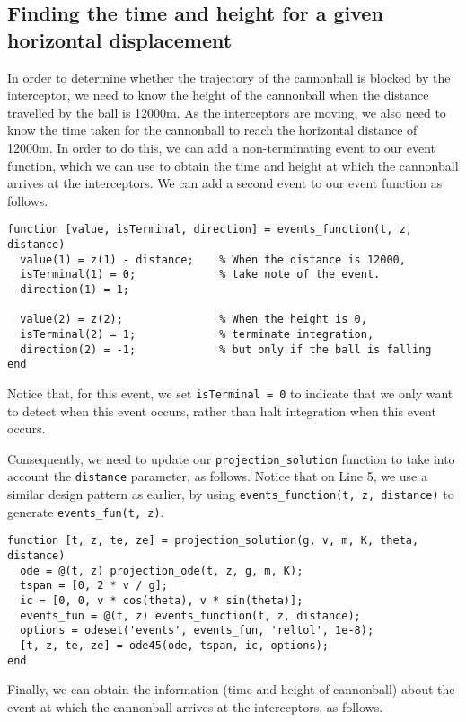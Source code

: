 \subsection{Finding the time and height for a given horizontal displacement}
In order to determine whether the trajectory of the cannonball is blocked by the interceptor, we need to know the height of the cannonball when the distance travelled by the ball is 12000m. As the interceptors are moving, we also need to know the time taken for the cannonball to reach the horizontal distance of 12000m. In order to do this, we can add a non-terminating event to our event function, which we can use to obtain the time and height at which the cannonball arrives at the interceptors. We can add a second event to our event function as follows.

\begin{lstlisting}
function [value, isTerminal, direction] = events_function(t, z, distance)
  value(1) = z(1) - distance;    % When the distance is 12000,
  isTerminal(1) = 0;             % take note of the event.
  direction(1) = 1;
  
  value(2) = z(2);               % When the height is 0,
  isTerminal(2) = 1;             % terminate integration,
  direction(2) = -1;             % but only if the ball is falling
end
\end{lstlisting}

\noindent
Notice that, for this event, we set \lstinline|isTerminal = 0| to indicate that we only want to detect when this event occurs, rather than halt integration when this event occurs.

\newpage
\noindent
Consequently, we need to update our \lstinline|projection_solution| function to take into account the \lstinline|distance| parameter, as follows. Notice that on Line 5, we use a similar design pattern as earlier, by using \lstinline|events_function(t, z, distance)| to generate \lstinline|events_fun(t, z)|.

\begin{lstlisting}
function [t, z, te, ze] = projection_solution(g, v, m, K, theta, distance)
  ode = @(t, z) projection_ode(t, z, g, m, K);
  tspan = [0, 2 * v / g];
  ic = [0, 0, v * cos(theta), v * sin(theta)];
  events_fun = @(t, z) events_function(t, z, distance);
  options = odeset('events', events_fun, 'reltol', 1e-8);
  [t, z, te, ze] = ode45(ode, tspan, ic, options);
end
\end{lstlisting}

\noindent
Finally, we can obtain the information (time and height of cannonball) about the event at which the cannonball arrives at the interceptors, as follows.

